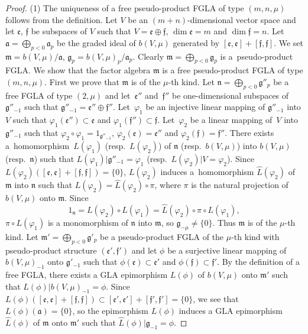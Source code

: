 \documentclass[pdftex]{sigma}
\numberwithin{equation}{section}
\numberwithin{theorem}{section}
\numberwithin{proposition}{section}
\numberwithin{lemma}{section}
\numberwithin{corollary}{section}
\numberwithin{definition}{section}
\numberwithin{example}{section}
\numberwithin{remark}{section}
\numberwithin{note}{section}
\begin{document}
\begin{proof} (1)
The uniqueness of a free pseudo-product FGLA of type $(m,n,\mu)$ follows from the def\/inition.
Let $V$ be an $(m+n)$-dimensional vector space and let
$\mathfrak e$, $\mathfrak f$ be subspaces of $V$
such that $V=\mathfrak e\oplus \mathfrak f$,
$\dim \mathfrak e=m$ and $\dim \mathfrak f=n$.
Let $\mathfrak a=\bigoplus\limits_{p<0}\mathfrak a_p$ be the graded ideal
of $b(V,\mu)$ generated by
$[\mathfrak e,\mathfrak e]+[\mathfrak f,\mathfrak f]$.
We set $\mathfrak m=b(V,\mu)/\mathfrak a$,
$\mathfrak g_p=b(V,\mu)_p/\mathfrak a_p$.
Clearly $\mathfrak m=\bigoplus\limits_{p<0}\mathfrak g_p$ is
a~pseudo-product FGLA.
We show that the factor algebra $\mathfrak m$
is a free pseudo-product FGLA of type $(m,n,\mu)$.
First we prove that $\mathfrak m$ is of the $\mu$-th kind.
Let $\mathfrak n=\bigoplus\limits_{p<0}\mathfrak g''_p$ be
a free FGLA of type $(2,\mu)$ and let~$\mathfrak e''$ and~$\mathfrak f''$
be one-dimensional subspaces of $\mathfrak g''_{-1}$ such that
$\mathfrak g''_{-1}=\mathfrak e''\oplus\mathfrak f''$.
Let~$\varphi_1$ be an injective linear mapping of $\mathfrak g''_{-1}$
into $V$ such that
$\varphi_1(\mathfrak e'')\subset \mathfrak e$ and
$\varphi_1(\mathfrak f'')\subset \mathfrak f$.
Let~$\varphi_2$ be a linear mapping of~$V$
into $\mathfrak g''_{-1}$ such that
$\varphi_2\circ\varphi_1=1_{\mathfrak g''_{-1}}$,
$\varphi_2(\mathfrak e)=\mathfrak e''$ and
$\varphi_2(\mathfrak f)=\mathfrak f''$.
There exists
a~homomorphism~$L(\varphi_1)$ (resp.~$L(\varphi_2)$) of
$\mathfrak n$ (resp.~$b(V,\mu)$) into
$b(V,\mu)$ (resp.~$\mathfrak n$)
such that
$L(\varphi_1)|\mathfrak g''_{-1}=\varphi_1$
(resp.\ $L(\varphi_2)|V=\varphi_2$).
Since $L(\varphi_2)([\mathfrak e,\mathfrak e]+[\mathfrak f,\mathfrak f])=\{0\}$,
$L(\varphi_2)$ induces a~homomorphism $\hat{L}(\varphi_2)$ of
$\mathfrak m$ into $\mathfrak n$ such that
$L(\varphi_2)=\hat{L}(\varphi_2)\circ \pi$,
where $\pi$ is the natural projection of $b(V,\mu)$ onto
$\mathfrak m$. Since
\[
1_{\mathfrak n}=L(\varphi_2)\circ L(\varphi_1)
=\hat{L}(\varphi_2)\circ \pi\circ L(\varphi_1),
\]
$\pi\circ L(\varphi_1)$ is a monomorphism of $\mathfrak n$ into $\mathfrak m$, so $\mathfrak g_{-\mu}\ne\{0\}$.
Thus $\mathfrak m$ is of the $\mu$-th kind.
Let $\mathfrak m'=\bigoplus\limits_{p<0}\mathfrak g'_p$ be a pseudo-product
FGLA of the $\mu$-th kind
with pseudo-product structure $(\mathfrak e',\mathfrak f')$
and let $\phi$ be a surjective linear mapping of $b(V,\mu)_{-1}$ onto
$\mathfrak g'_{-1}$ such that
$\phi(\mathfrak e)\subset\mathfrak e'$ and
$\phi(\mathfrak f)\subset\mathfrak f'$.
By the def\/inition of a free FGLA,
there exists a GLA epimorphism $L(\phi)$ of
$b(V,\mu)$ onto $\mathfrak m'$ such that
$L(\phi)|b(V,\mu)_{-1}=\phi$.
Since $L(\phi)([\mathfrak e,\mathfrak e]+[\mathfrak f,\mathfrak f])\subset [\mathfrak e',\mathfrak e']+[\mathfrak f',\mathfrak f']=\{0\}$,
we see that $L(\phi)(\mathfrak a)=\{0\}$, so
the epimorphism $L(\phi)$ induces a GLA epimorphism
$\hat{L}(\phi)$ of $\mathfrak m$ onto $\mathfrak m'$ such that
$\hat{L}(\phi)|\mathfrak g_{-1}=\phi$.


\end{proof}
\end{document}
